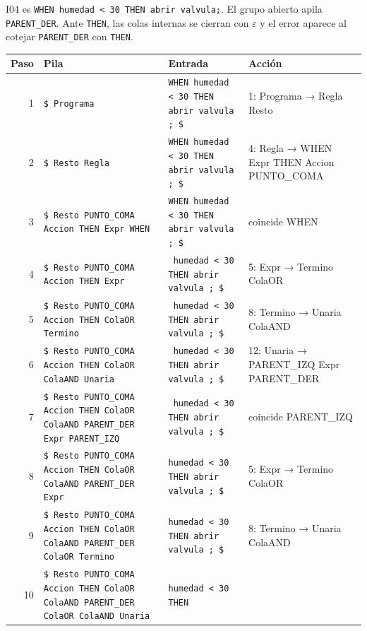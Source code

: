 \documentclass[11pt,a4paper]{article}
\newcommand{\tk}[1]{\texttt{#1}}
\begin{document}
I04 es \texttt{WHEN humedad < 30 THEN abrir valvula;}. El grupo
abierto apila \tk{PARENT\_DER}. Ante \tk{THEN}, las colas internas se
cierran con $\varepsilon$ y el error aparece al cotejar
\tk{PARENT\_DER} con \tk{THEN}.

\begingroup
\footnotesize
\begin{xltabular}{\textwidth}{r Y{1.3} Y{0.9} Y{0.8}}
  \toprule
  \textbf{Paso} & \textbf{Pila} & \textbf{Entrada} & \textbf{Acción} \\
  \midrule
   & \texttt{\$ Programa} & \texttt{WHEN  humedad < 30 THEN abrir
  valvula ; \$} & 1: Programa → Regla Resto \\
  2 & \texttt{\$ Resto Regla} & \texttt{WHEN  humedad < 30 THEN
  abrir valvula ; \$} & 4: Regla → WHEN Expr THEN Accion PUNTO\_COMA \\
  3 & \texttt{\$ Resto PUNTO\_\allowbreak{}COMA Accion THEN
  Expr WHEN} & \texttt{WHEN  humedad < 30 THEN abrir valvula ;
  \$} & coincide WHEN \\
  4 & \texttt{\$ Resto PUNTO\_\allowbreak{}COMA Accion THEN
  Expr} & \texttt{ humedad < 30 THEN abrir valvula ; \$} &
  5: Expr → Termino ColaOR \\
  5 & \texttt{\$ Resto PUNTO\_\allowbreak{}COMA Accion THEN
  ColaOR Termino} & \texttt{ humedad < 30 THEN abrir
  valvula ; \$} & 8: Termino → Unaria ColaAND \\
  6 & \texttt{\$ Resto PUNTO\_\allowbreak{}COMA Accion
  THEN ColaOR ColaAND Unaria} & \texttt{ humedad < 30
  THEN abrir valvula ; \$} & 12: Unaria → PARENT\_IZQ
  Expr PARENT\_DER \\
  7 & \texttt{\$ Resto PUNTO\_\allowbreak{}COMA Accion
    THEN ColaOR ColaAND PARENT\_\allowbreak{}DER Expr
  PARENT\_\allowbreak{}IZQ} & \texttt{ humedad < 30
  THEN abrir valvula ; \$} & coincide PARENT\_IZQ \\
  8 & \texttt{\$ Resto PUNTO\_\allowbreak{}COMA
    Accion THEN ColaOR ColaAND PARENT\_\allowbreak{}DER
  Expr} & \texttt{humedad < 30 THEN abrir valvula ;
  \$} & 5: Expr → Termino ColaOR \\
  9 & \texttt{\$ Resto PUNTO\_\allowbreak{}COMA
    Accion THEN ColaOR ColaAND PARENT\_\allowbreak{}DER
  ColaOR Termino} & \texttt{humedad < 30 THEN abrir
  valvula ; \$} & 8: Termino → Unaria ColaAND \\
  10 & \texttt{\$ Resto PUNTO\_\allowbreak{}COMA
    Accion THEN ColaOR ColaAND PARENT\_\allowbreak{}DER
  ColaOR ColaAND Unaria} & \texttt{humedad < 30 THEN
}
\end{xltabular}
\end{document}
